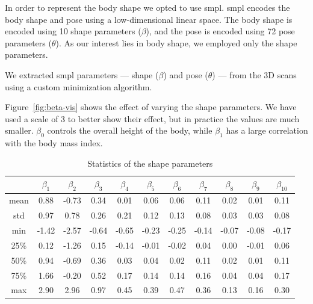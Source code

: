 In order to represent the body shape we opted to use \gls{smpl}. \gls{smpl}
encodes the body shape and pose using a low-dimensional linear space. The body
shape is encoded using 10 shape parameters ($\beta$), and the pose is encoded
using 72 pose parameters ($\theta$). As our interest lies in body shape, we
employed only the shape parameters.

We extracted \gls{smpl} parameters --- shape ($\beta$) and pose ($\theta$) ---
from the 3D scans using a custom minimization algorithm.



Figure~\ref{fig:beta-vis} shows the effect of varying the shape parameters. We
have used a scale of 3 to better show their effect, but in practice the values
are much smaller. $\beta_0$ controls the overall height of the body, while
$\beta_1$ has a large correlation with the body mass index.

\begin{table}[h]
    \centering
    \begin{tabular}{c | c c c c c c c c c c}
        \toprule
             & $\beta_1$ & $\beta_2$ & $\beta_3$ & $\beta_4$ & $\beta_5$ & $\beta_6$ & $\beta_7$ & $\beta_8$ & $\beta_9$ & $\beta_{10}$ \\
        \midrule
        mean & 0.88      & -0.73     & 0.34      & 0.01      & 0.06      & 0.06      & 0.11      & 0.02      & 0.01      & 0.11         \\

        std  & 0.97      & 0.78      & 0.26      & 0.21      & 0.12      & 0.13      & 0.08      & 0.03      & 0.03      & 0.08         \\

        min  & -1.42     & -2.57     & -0.64     & -0.65     & -0.23     & -0.25     & -0.14     & -0.07     & -0.08     &
        -0.17                                                                                                                           \\

        25\% & 0.12      & -1.26     & 0.15      & -0.14     & -0.01     & -0.02     & 0.04      & 0.00      & -0.01     & 0.06         \\

        50\% & 0.94      & -0.69     & 0.36      & 0.03      & 0.04      & 0.02      & 0.11      & 0.02      & 0.01      & 0.11         \\

        75\% & 1.66      & -0.20     & 0.52      & 0.17      & 0.14      & 0.14      & 0.16      & 0.04      & 0.04      & 0.17         \\

        max  & 2.90      & 2.96      & 0.97      & 0.45      & 0.39      & 0.47      & 0.36      & 0.13      & 0.16      & 0.30         \\
        \bottomrule
    \end{tabular}
    \caption{Statistics of the shape parameters}
\end{table}

